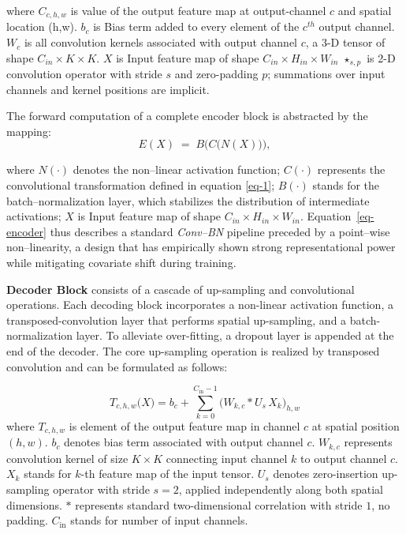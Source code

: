 \documentclass[a4paper, times, 10pt,twocolumn]{article}
\begin{document}
where
$C_{c,h,w}$ is value of the output feature map at output-channel $c$ and spatial location (h,w).
$b_c$ is Bias term added to every element of the $c^{th}$ output channel.
$W_c$ is all convolution kernels associated with output channel $c$, a 3-D tensor of shape $C_{in} \times K \times K$.
$X$ is Input feature map of shape $C_{in} \times H_{in} \times W_{in}$
$\star_{s,p}$ is 2-D convolution operator with stride $s$ and zero-padding $p$; summations over input channels and kernel positions are implicit.

The forward computation of a complete encoder block is abstracted by the mapping:
\begin{equation}
	\label{eq-encoder}
	E(X) \;=\; B\!\bigl(C\!\bigl(N(X)\bigr)\bigr),
\end{equation}

where
$N(\cdot)$ denotes the non--linear activation function;
$C(\cdot)$ represents the convolutional transformation defined in equation \eqref{eq-1};
$B(\cdot)$ stands for the batch--normalization layer, which stabilizes the distribution of intermediate activations;
$X$ is Input feature map of shape $C_{in} \times H_{in} \times W_{in}$.
Equation~\eqref{eq-encoder} thus describes a standard \emph{Conv--BN} pipeline preceded by a point--wise non--linearity, a design that has empirically shown strong representational power while mitigating covariate shift during training.

\textbf{Decoder Block} consists of a cascade of up-sampling and convolutional operations.
Each decoding block incorporates a non-linear activation function, a transposed-convolution layer that performs spatial up-sampling, and a batch-normalization layer.
To alleviate over-fitting, a dropout layer is appended at the end of the decoder.
The core up-sampling operation is realized by transposed convolution and can be formulated as follows:

\begin{equation}
	\label{eq-tconv}
	T_{c,h,w} \bigl( X \bigr) = b_{c} + \sum_{k=0}^{C_{\mathrm{in}}-1} \bigl( W_{k,c}*U_{s}\,X_{k} \bigr)_{h,w}
\end{equation}
where $T_{c,h,w}$ is element of the output feature map in channel $c$ at spatial position $(h,w)$.
$b_{c}$ denotes bias term associated with output channel $c$.
$W_{k,c}$ represents convolution kernel of size $K\times K$ connecting input channel $k$ to output channel $c$.
$X_{k}$ stands for $k$-th feature map of the input tensor.
$U_{s}$ denotes zero-insertion up-sampling operator with stride $s=2$, applied independently along both spatial dimensions.
$*$ represents standard two-dimensional correlation with stride $1$, no padding.
$C_{\mathrm{in}}$ stands for number of input channels.
\end{document}
